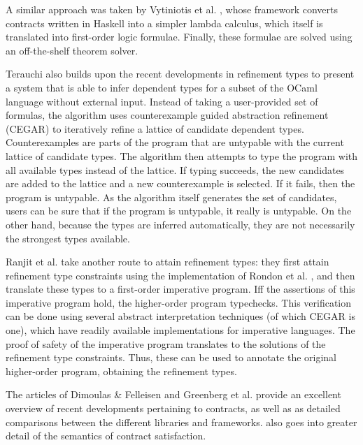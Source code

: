 \documentclass[10pt]{report}
\begin{document}
A similar approach was taken by Vytiniotis et al. \cite{Vytiniotis:2013ww}, whose framework converts contracts written in Haskell into a simpler lambda calculus, which itself is translated into first-order logic formulae.
Finally, these formulae are solved using an off-the-shelf theorem solver.

Terauchi \cite{terauchi2010dependent} also builds upon the recent developments in refinement types to present a system that is able to infer dependent types for a subset of the OCaml language without external input.
Instead of taking a user-provided set of formulas, the algorithm uses counterexample guided abstraction refinement (CEGAR) to iteratively refine a lattice of candidate dependent types.
Counterexamples are parts of the program that are untypable with the current lattice of candidate types.
The algorithm then attempts to type the program with all available types instead of the lattice.
If typing succeeds, the new candidates are added to the lattice and a new counterexample is selected.
If it fails, then the program is untypable.
As the algorithm itself generates the set of candidates, users can be sure that if the program is untypable, it really is untypable.
On the other hand, because the types are inferred automatically, they are not necessarily the strongest types available.

Ranjit et al. \cite{jhala2010refinement} take another route to attain refinement types: they first attain refinement type constraints using the implementation of Rondon et al. \cite{rondon2008liquid}, and then translate these types to a first-order imperative program.
Iff the assertions of this imperative program hold, the higher-order program typechecks.
This verification can be done using several abstract interpretation techniques (of which CEGAR is one), which have readily available implementations for imperative languages.
The proof of safety of the imperative program translates to the solutions of the refinement type constraints.
Thus, these can be used to annotate the original higher-order program, obtaining the refinement types.

The articles of Dimoulas \& Felleisen \cite{Dimoulas:2011:CSH:2039346.2039348} and Greenberg et al. \cite{Greenberg:2010:CMM:1707801.1706341} provide an excellent overview of recent developments pertaining to contracts, as well as as detailed comparisons between the different libraries and frameworks. \cite{Dimoulas:2011:CSH:2039346.2039348} also goes into greater detail of the semantics of contract satisfaction.
\end{document}
